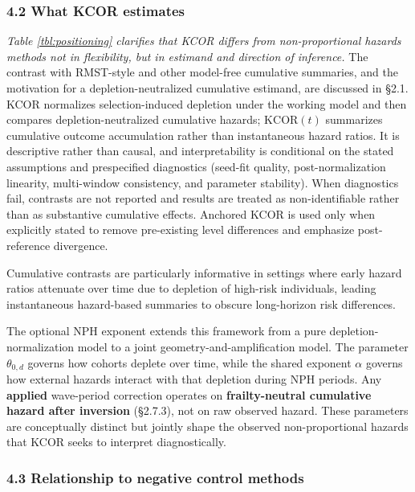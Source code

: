 \documentclass[
]{article}
\begin{document}
\subsubsection{4.2 What KCOR estimates}\label{what-kcor-estimates}

\emph{Table \ref{tbl:positioning} clarifies that KCOR differs from
non-proportional hazards methods not in flexibility, but in estimand and
direction of inference.} The contrast with RMST-style and other
model-free cumulative summaries, and the motivation for a
depletion-neutralized cumulative estimand, are discussed in §2.1. KCOR
normalizes selection-induced depletion under the working model and then
compares depletion-neutralized cumulative hazards; \(\mathrm{KCOR}(t)\)
summarizes cumulative outcome accumulation rather than instantaneous
hazard ratios. It is descriptive rather than causal, and
interpretability is conditional on the stated assumptions and
prespecified diagnostics (seed-fit quality, post-normalization
linearity, multi-window consistency, and parameter stability). When
diagnostics fail, contrasts are not reported and results are treated as
non-identifiable rather than as substantive cumulative effects. Anchored
KCOR is used only when explicitly stated to remove pre-existing level
differences and emphasize post-reference divergence.

Cumulative contrasts are particularly informative in settings where
early hazard ratios attenuate over time due to depletion of high-risk
individuals, leading instantaneous hazard-based summaries to obscure
long-horizon risk differences.

The optional NPH exponent extends this framework from a pure
depletion-normalization model to a joint geometry-and-amplification
model. The parameter \(\theta_{0,d}\) governs how cohorts deplete over
time, while the shared exponent \(\alpha\) governs how external hazards
interact with that depletion during NPH periods. Any \textbf{applied}
wave-period correction operates on \textbf{frailty-neutral cumulative
hazard after inversion} (§2.7.3), not on raw observed hazard. These
parameters are conceptually distinct but jointly shape the observed
non-proportional hazards that KCOR seeks to interpret diagnostically.

\subsubsection{4.3 Relationship to negative control
methods}\label{relationship-to-negative-control-methods}
\end{document}
